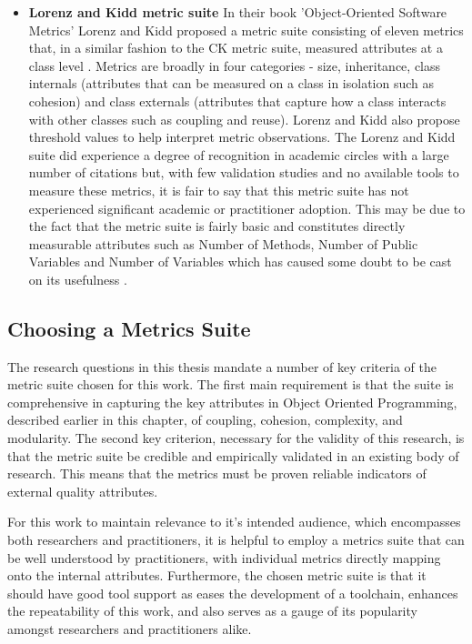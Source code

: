 \begin{itemize}
\item \textbf{Lorenz and Kidd metric suite} In their book 'Object-Oriented Software Metrics' Lorenz and Kidd proposed a metric suite consisting of eleven metrics that, in a similar fashion to the CK metric suite, measured attributes at a class level \citep{lorenz1994object}. Metrics are broadly in four categories - size, inheritance, class internals (attributes that can be measured on a class in isolation such as cohesion) and class externals (attributes that capture how a class interacts with other classes such as coupling and reuse). Lorenz and Kidd also propose threshold values to help interpret metric observations. The Lorenz and Kidd suite did experience a degree of recognition in academic circles with a large number of citations \citep{nesi1998effort} but, with few validation studies \citep{sharma2012metrics} and no available tools to measure these metrics, it is fair to say that this metric suite has not experienced significant academic or practitioner adoption. This may be due to the fact that the metric suite is fairly basic and constitutes directly measurable attributes such as Number of Methods, Number of Public Variables and Number of Variables which has caused some doubt to be cast on its usefulness \citep{harrison1998investigation}.
\end{itemize}

\subsection{Choosing a Metrics Suite} The research questions in this thesis mandate a number of key criteria of the metric suite chosen for this work. The first main requirement is that the suite is comprehensive in capturing the key attributes in Object Oriented Programming, described earlier in this chapter, of coupling, cohesion, complexity, and modularity. The second key criterion, necessary for the validity of this research, is that the metric suite be credible and empirically validated in an existing body of research. This means that the metrics must be proven reliable indicators of external quality attributes.

For this work to maintain relevance to it's intended audience, which encompasses both researchers and practitioners, it is helpful to employ a metrics suite that can be well understood by practitioners, with individual metrics directly mapping onto the internal attributes. Furthermore, the chosen metric suite is that it should have good tool support as eases the development of a toolchain, enhances the repeatability of this work, and also serves as a gauge of its popularity amongst researchers and practitioners alike. 

